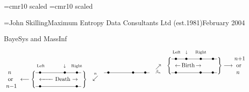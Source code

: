 \def\Da{$\ \ {\cal D}_0\ $}
\def\Db{$\ \ {\cal D}_1\ $}
\def\Dc{$\ \ {\cal D}_2\ $}
\def\Dd{$\ \ {\cal D}_3\ $}
\def\P{\phantom{$\ \ {\cal D}_3\ $}}
\def\H{\hfill\vrule\hfill}

\def\bfpi{\hbox{$\pi$ \hskip -9.2pt $\pi$ \hskip -9.2pt $\pi$ \hskip -9.2pt $\pi$ \hskip -9.2pt $\pi$}}

\font\biggest=cmr10 scaled
\font\bigger=cmr10 scaled

\footline={\tenrm\qquad John Skilling\quad\hfil Maximum Entropy Data Consultants Ltd (est.1981)\hfil\quad February 2004\qquad}

\vskip 6cm
\centerline{\biggest BayeSys and MassInf}

\vskip 3cm
$$
\hbox{
\lower 12pt\vbox{\hbox{\ $n$}
                 \hbox{\ or}
                 \hbox{$n-$1}}
                }
\longleftarrow
\Bigg\{
\lower 12pt\vbox{ \hbox{\hskip 2pt {$\scriptstyle\rm Left$} \hskip 29.5pt $\scriptstyle\downarrow$ \hskip 6pt {$\scriptstyle\rm Right$}}
                  \LineThree
                  \hbox{\hskip 6pt \hbox to 25pt{\leftarrowfill} Death $\rightarrow$}
                  \LineTwo
                }
\Bigg\}
\hskip10pt \raise 2pt\DeathArrow \hskip10pt
\raise 12pt\LineThree
\hskip10pt \raise 14pt\BirthArrow \hskip10pt
\raise 24pt\hbox{$
                  \Bigg\{
                  \lower 12pt\vbox{ \hbox{\hskip 2pt {$\scriptstyle\rm Left$} \hskip 5pt $\scriptstyle\downarrow$ \hskip 10pt {$\scriptstyle\rm Right$}}
                                    \LineFour
                                    \hbox{\hskip 6pt $\leftarrow\,$Birth$\,\rightarrow$}
                                    \LineThree
                                  }
                  \Bigg\}
                  \longrightarrow
                  \hbox{\lower 12pt \vbox{ \hbox{$n$+1}
                                           \hbox{\ or}
                                           \hbox{\ $n$}}
                                         }
                $}
$$

